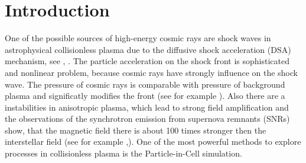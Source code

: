 \section{Introduction}
One of the possible sources of high-energy cosmic rays are shock waves in astrophysical collisionless plasma due to the diffusive shock acceleration (DSA) mechanism, see \cite{Bell1978}, \cite{Blandford1978}. The particle acceleration on the shock front is sophisticated and nonlinear problem, because cosmic rays have strongly influence on the shock wave. The pressure of cosmic rays is comparable with pressure of background plasma and significatly modifies the front (see for example \cite{Bykov2014}). Also there are a instabilities in anisotropic plasma, which lead to strong field amplification and the observations of the synchrotron emission from supernova remnants (SNRs) show, that the magnetic field there is about 100 times stronger then the interstellar field (see for example \cite{Berezhko2003},\cite{Uchiyama2007}). One of the most powerful methods to explore processes in collisionless plasma is the Particle-in-Cell simulation. 

